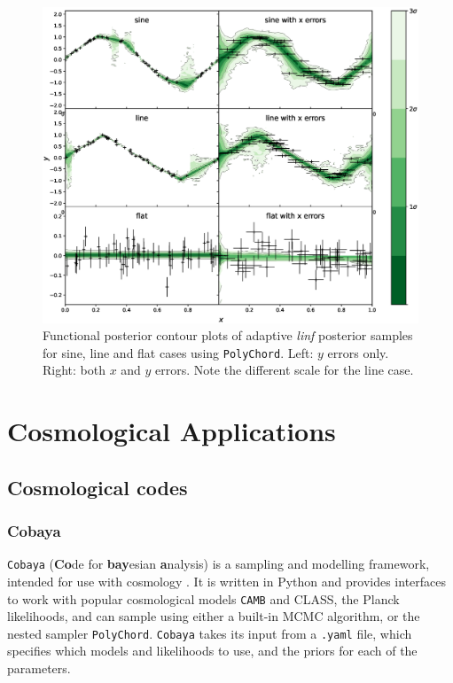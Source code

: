 \documentclass{article}
\begin{document}
\begin{figure}[H]
  \centering
  \includegraphics[width=16cm]{toysineadaptive.eps}
  \caption{Functional posterior contour plots of adaptive \textit{linf} posterior samples for sine, line and flat cases using \texttt{PolyChord}. Left: $y$ errors only. Right: both $x$ and $y$ errors. Note the different scale for the line case.}
  \label{fig:toysineadaptive}
\end{figure}

\newpage

\section{Cosmological Applications}
\subsection{Cosmological codes}

\subsubsection{Cobaya}
\texttt{Cobaya} (\textbf{Co}de for \textbf{bay}esian \textbf{a}nalysis) is a sampling and modelling framework, intended for use with cosmology \cite{Cobaya}. It is written in Python and provides interfaces to work with popular cosmological models \texttt{CAMB} and CLASS, the Planck likelihoods, and can sample using either a built-in MCMC algorithm, or the nested sampler \texttt{PolyChord}. \texttt{Cobaya} takes its input from a \texttt{.yaml} file, which specifies which models and likelihoods to use, and the priors for each of the parameters. 
\end{document}
